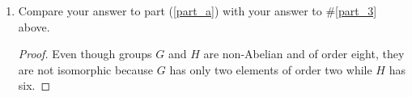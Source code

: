 \documentclass{article}
\begin{document}
\begin{enumerate}
\begin{enumerate}
\begin{proof}
\begin{center}
\begin{tabular}{|r||r|r|r|r|r|r|r|r|}
              \hline
              $-B$      & $AB$  & $-AB$ & $-I$  & $I$   & $A$   & $-A$  & $-B$  & $B$ \\
              \hline
              $AB$      & $B$   & $-B$  & $A$   & $-A$  & $I$   & $-I$  & $AB$  & $-AB$ \\
              \hline
              $-AB$     & $-B$  & $B$   & $-A$  & $A$   & $-I$  & $I$   & $-AB$ & $AB$ \\
              \hline
              $I$       & $A$   & $-A$  & $B$   & $-B$  & $AB$  & $-AB$ & $I$   & $-I$ \\
              \hline
              $-I$      & $-A$  & $A$   & $-B$  & $B$   & $-AB$ & $AB$  & $-I$  & $I$ \\
              \hline
            \end{tabular}
          \end{center}
        \end{proof}
      \item Compare your answer to part (\ref{part_a}) with your answer to
        \#\ref{part_3} above.
        \begin{proof}
          Even though groups $G$ and $H$ are non-Abelian and of order eight,
          they are not isomorphic because $G$ has only two elements of
          order two while $H$ has six.
        \end{proof}
    \end{enumerate}


\end{enumerate}
\end{document}
